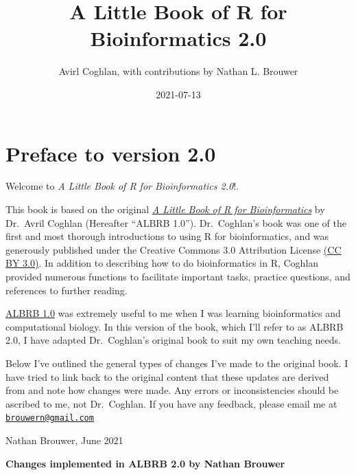 \documentclass[
]{book}
\title{A Little Book of R for Bioinformatics 2.0}
\author{Avirl Coghlan, with contributions by Nathan L. Brouwer}
\date{2021-07-13}
\begin{document}
\maketitle

{
\setcounter{tocdepth}{1}
\tableofcontents
}
\hypertarget{preface-to-version-2.0}{%
\chapter*{Preface to version 2.0}\label{preface-to-version-2.0}}

Welcome to \emph{A Little Book of R for Bioinformatics 2.0}!.

This book is based on the original \href{https://a-little-book-of-r-for-bioinformatics.readthedocs.io/en/latest/}{\emph{A Little Book of R for Bioinformatics}} by Dr.~Avril Coghlan (Hereafter ``ALBRB 1.0''). Dr.~Coghlan's book was one of the first and most thorough introductions to using R for bioinformatics, and was generously published under the Creative Commons 3.0 Attribution License \href{https://creativecommons.org/licenses/by/3.0/}{(CC BY 3.0)}. In addition to describing how to do bioinformatics in R, Coghlan provided numerous functions to facilitate important tasks, practice questions, and references to further reading.

\href{https://a-little-book-of-r-for-bioinformatics.readthedocs.io/en/latest/}{ALBRB 1.0} was extremely useful to me when I was learning bioinformatics and computational biology. In this version of the book, which I'll refer to as ALBRB 2.0, I have adapted Dr.~Coghlan's original book to suit my own teaching needs.

Below I've outlined the general types of changes I've made to the original book. I have tried to link back to the original content that these updates are derived from and note how changes were made. Any errors or inconsistencies should be ascribed to me, not Dr.~Coghlan. If you have any feedback, please email me at \href{mailto:brouwern@gmail.com}{\nolinkurl{brouwern@gmail.com}}

Nathan Brouwer, June 2021

\textbf{Changes implemented in ALBRB 2.0 by Nathan Brouwer}
\end{document}
